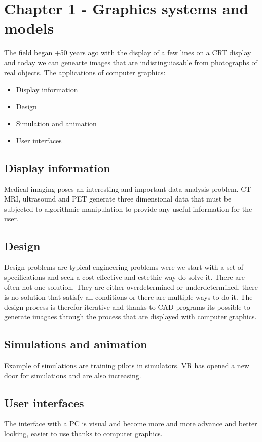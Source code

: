 \section{Chapter 1 - Graphics systems and models}
The field began +50 years ago with the display of a few lines on a CRT display and today we can genearte images that are indistinguiasable from photographs of real objects. The applications of computer graphics:

\begin{itemize}
	\item Display information
	\item Design
	\item Simulation and animation
	\item User interfaces
\end{itemize}

\subsection*{Display information}

Medical imaging poses an interesting and important data-analysis problem. CT MRI, ultrasound and PET generate three dimensional data that  must be subjected to algorithmic manipulation to provide any useful information for the user. 

\subsection*{Design}
Design problems are typical engineering problems were we start with a set of specifications and seek a cost-effective and estethic way do solve it. There are often not one solution. They are either overdetermined or underdetermined, there is no solution that satisfy all conditions or there are multiple ways to do it. The design process is therefor iterative and thanks to CAD programs its possible to generate imagaes through the process that are displayed with computer graphics. 

\subsection*{Simulations and animation}
Example of simulations are training pilots in simulators. VR has opened a new door for simulations and are also increasing.

\subsection*{User interfaces}
The interface with a PC is visual and become more and more advance and better looking, easier to use thanks to computer graphics.

